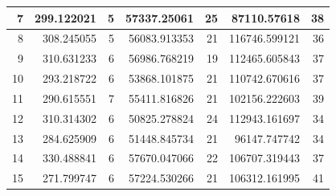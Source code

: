 \begin{table}
\begin{adjustwidth}{}{}
{{\begin{tabular}{|r|r|r|r|r|r|r|}
\hline
7                                          & 299.122021                   & 5                                     & 57337.25061                    & 25                                    & 87110.57618                  & 38                                     \\ 
\hline
8                                          & 308.245055                   & 5                                     & 56083.913353                   & 21                                    & 116746.599121                & 36                                     \\ 
\hline
9                                          & 310.631233                   & 6                                     & 56986.768219                   & 19                                    & 112465.605843                & 37                                     \\ 
\hline
10                                         & 293.218722                   & 6                                     & 53868.101875                   & 21                                    & 110742.670616                & 37                                     \\ 
\hline
11                                         & 290.615551                   & 7                                     & 55411.816826                   & 21                                    & 102156.222603                & 39                                     \\ 
\hline
12                                         & 310.314302                   & 6                                     & 50825.278824                   & 24                                    & 112943.161697                & 34                                     \\ 
\hline
13                                         & 284.625909                   & 6                                     & 51448.845734                   & 21                                    & 96147.747742                 & 34                                     \\ 
\hline
14                                         & 330.488841                   & 6                                     & 57670.047066                   & 22                                    & 106707.319443                & 37                                     \\ 
\hline
15                                         & 271.799747                   & 6                                     & 57224.530266                   & 21                                    & 106312.161995                & 41                                     \\ 

\end{tabular}}}
\end{adjustwidth}
\end{table}
